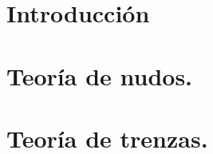 \documentclass[a4paper,12pt]{book}
\begin{document}
	\newtheorem{teo}{Teorema}[section]
	\newtheorem{pro}{Proposición}[section]
	\newtheorem{lem}{Lema}[section]
	\newtheorem{cor}{Corolario}[section]


\frontmatter
{}


\tableofcontents
\listoffigures

\mainmatter
\chapter{Introducción}
\label{ch0}


\chapter{Teoría de nudos.}
\label{ch1}








\chapter{Teoría de trenzas.}
\label{ch2}

\end{document}
